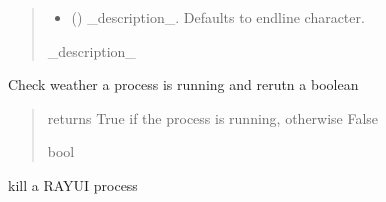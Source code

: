 \documentclass[letterpaper,10pt,english]{sphinxmanual}
\begin{document}
\begin{fulllineitems}
\begin{fulllineitems}
\begin{quote}
\begin{description}
\begin{itemize}
\item {} 
\sphinxAtStartPar
{} (\sphinxstyleliteralemphasis{\sphinxupquote{, }}) \textendash{} \_description\_. Defaults to endline character.

\end{itemize}

\sphinxAtStartPar
{} \textendash{} \_description\_

\end{description}\end{quote}

\end{fulllineitems}


\begin{fulllineitems}
\label{\detokenize{index:raypyng.runner.RayUIRunner.isrunning}}
\pysigstartsignatures
{}
\pysigstopsignatures
\sphinxAtStartPar
Check weather a process is running and rerutn a boolean
\begin{quote}\begin{description}
\sphinxAtStartPar
returns True if the process is running, otherwise False

\sphinxAtStartPar
bool

\end{description}\end{quote}

\end{fulllineitems}


\begin{fulllineitems}
\label{\detokenize{index:raypyng.runner.RayUIRunner.kill}}
\pysigstartsignatures
{}
\pysigstopsignatures
\sphinxAtStartPar
kill a RAY\sphinxhyphen{}UI process

\end{fulllineitems}


\end{fulllineitems}
\end{document}
